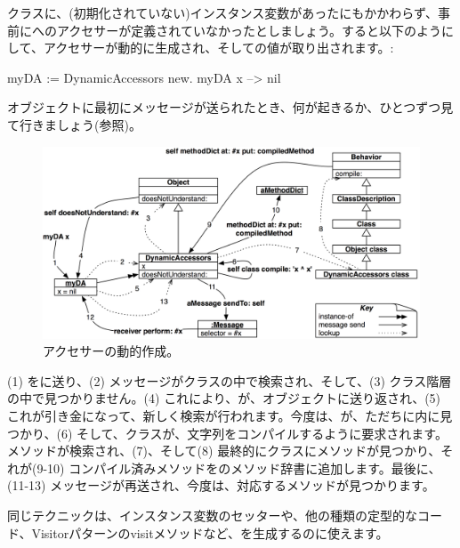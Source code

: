 \documentclass[a4paper,10pt,twoside]{book}
\begin{document}
クラスに、(初期化されていない)インスタンス変数があったにもかかわらず、事前にへのアクセサーが定義されていなかったとしましょう。すると以下のようにして、アクセサーが動的に生成され、そしての値が取り出されます。:
\begin{code}{}
myDA := DynamicAccessors new.
myDA x --> nil
\end{code}

オブジェクトに最初にメッセージが送られたとき、何が起きるか、ひとつずつ見て行きましょう(参照)。

\begin{figure}[ht]\centering
	\includegraphics[width=\linewidth]{DynamicAccessors}
	\caption{アクセサーの動的作成。}
\end{figure}

(1) をに送り、(2) メッセージがクラスの中で検索され、そして、(3) クラス階層の中で見つかりません。(4) これにより、が、オブジェクトに送り返され、(5) これが引き金になって、新しく検索が行われます。今度は、が、ただちに内に見つかり、(6) そして、クラスが、文字列をコンパイルするように要求されます。メソッドが検索され、(7)、そして(8) 最終的にクラスにメソッドが見つかり、それが(9-10) コンパイル済みメソッドをのメソッド辞書に追加します。最後に、(11-13) メッセージが再送され、今度は、対応するメソッドが見つかります。

同じテクニックは、インスタンス変数のセッターや、他の種類の定型的なコード、Visitorパターンのvisitメソッドなど、を生成するのに使えます。
\end{document}
